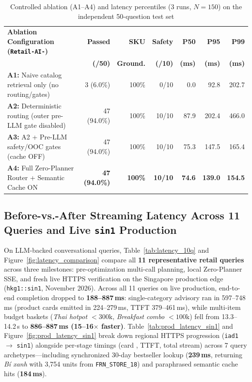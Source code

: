 \begin{table}[H]
\centering
\caption{Controlled ablation (A1--A4) and latency percentiles (3 runs, $N=150$) on the independent 50-question test set}
\label{tab:retail_ablation_50q}
\footnotesize
\setlength{\tabcolsep}{3.8pt}
\begin{tabularx}{\textwidth}{Y r r r r r r}
\toprule
\textbf{Ablation Configuration (\texttt{Retail-AI-})} & \textbf{Passed} & \textbf{SKU} & \textbf{Safety} & \textbf{P50} & \textbf{P95} & \textbf{P99} \\
 & \textbf{(/50)} & \textbf{Ground.} & \textbf{(/10)} & \textbf{(ms)} & \textbf{(ms)} & \textbf{(ms)} \\
\midrule
\textbf{A1:} Naive catalog retrieval only (no routing/gates) & 3 (6.0\%) & 100\% & 0/10 & 0.0 & 92.8 & 202.7 \\
\textbf{A2:} Deterministic routing (outer pre-LLM gate disabled) & 47 (94.0\%) & 100\% & 10/10 & 87.9 & 202.4 & 466.0 \\
\textbf{A3:} A2 + Pre-LLM safety/OOC gates (cache OFF) & 47 (94.0\%) & 100\% & 10/10 & 75.3 & 147.5 & 165.4 \\
\textbf{A4:} Full Zero-Planner Router + Semantic Cache ON & \textbf{47 (94.0\%)} & \textbf{100\%} & \textbf{10/10} & \textbf{74.6} & \textbf{139.0} & \textbf{154.5} \\
\bottomrule
\end{tabularx}
\end{table}

\subsection*{Before-vs.-After Streaming Latency Across 11 Queries and Live \texttt{sin1} Production}
On LLM-backed conversational queries, Table~\ref{tab:latency_10q} and Figure~\ref{fig:latency_comparison} compare all \textbf{11 representative retail queries} across three milestones: pre-optimization multi-call planning, local Zero-Planner SSE, and fresh live HTTPS verification on the Singapore production edge (\texttt{hkg1::sin1}, November 2026). Across all 11 queries on live production, end-to-end completion dropped to \textbf{188--887\,ms}: single-category advisory ran in 597--748\,ms (product cards emitted in 224--279\,ms, TTFT 379--461\,ms), while multi-item budget baskets (\emph{Thai hotpot $<300\text{k}$}, \emph{Breakfast combo $<100\text{k}$}) fell from 13.3--14.2\,s to \textbf{886--887\,ms (15--16$\times$ faster)}. Table~\ref{tab:prod_latency_sin1} and Figure~\ref{fig:prod_latency_sin1} break down regional HTTPS progression (\texttt{iad1} $\to$ \texttt{sin1}) alongside per-stage timings (card , TTFT, total stream) across 7 query archetypes---including synchronized 30-day bestseller lookup (\textbf{239\,ms}, returning \emph{Bí xanh} with 3,754 units from \texttt{FRN\_STORE\_18}) and paraphrased semantic cache hits (\textbf{184\,ms}).

